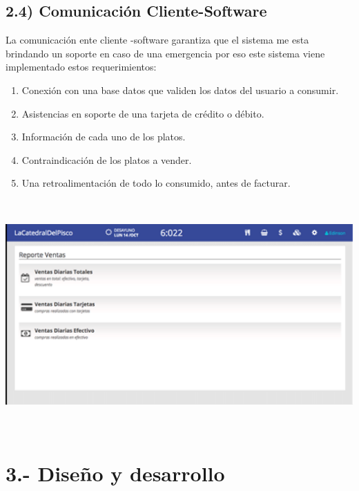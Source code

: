 \documentclass{article} %
\begin{document}
\noindent 

\noindent 

\noindent 


\subsection{2.4) Comunicaci\'{o}n Cliente-Software}

\noindent La comunicaci\'{o}n ente cliente -software garantiza que el sistema me esta brindando un soporte en caso de una emergencia por eso este sistema viene implementado estos requerimientos:

\begin{enumerate}
\item  Conexi\'{o}n con una base datos que validen los datos del usuario a consumir.

\item  Asistencias en soporte de una tarjeta de cr\'{e}dito o d\'{e}bito.

\item  Informaci\'{o}n de cada uno de los platos.

\item  Contraindicaci\'{o}n de los platos a vender.

\item  Una retroalimentaci\'{o}n de todo lo consumido, antes de facturar.
\end{enumerate}

\noindent \includegraphics*[width=6.67in, height=3.46in, keepaspectratio=false]{image7}

\noindent 


\section{3.- Dise\~{n}o y desarrollo}
\end{document}
